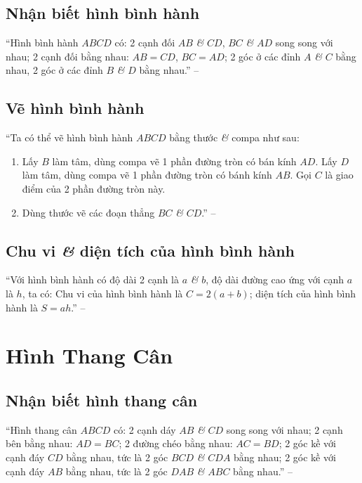 \documentclass[oneside]{book}
\numberwithin{equation}{section}
\begin{document}
\subsection{Nhận biết hình bình hành}
``Hình bình hành $ABCD$ có: 2 cạnh đối $AB$ \textit{\&} $CD$, $BC$ \textit{\&} $AD$ song song với nhau; 2 cạnh đối bằng nhau: $AB = CD$, $BC = AD$; 2 góc ở các đỉnh $A$ \textit{\&} $C$ bằng nhau, 2 góc ở các đỉnh $B$ \textit{\&} $D$ bằng nhau.'' -- \cite[p. 102]{Thai_Anh_Dat_Ha_Loan_Nam_Quang_Toan_6_tap_1}

\subsection{Vẽ hình bình hành}
``Ta có thể vẽ hình bình hành $ABCD$ bằng thước \textit{\&} compa như sau:
\begin{enumerate}
	\item Lấy $B$ làm tâm, dùng compa vẽ 1 phần đường tròn có bán kính $AD$. Lấy $D$ làm tâm, dùng compa vẽ 1 phần đường tròn có bánh kính $AB$. Gọi $C$ là giao điểm của 2 phần đường tròn này.
	\item Dùng thước vẽ các đoạn thẳng $BC$ \textit{\&} $CD$.'' -- \cite[p. 103]{Thai_Anh_Dat_Ha_Loan_Nam_Quang_Toan_6_tap_1}
\end{enumerate}

\subsection{Chu vi \textit{\&} diện tích của hình bình hành}
``Với hình bình hành có độ dài 2 cạnh là $a$ \textit{\&} $b$, độ dài đường cao ứng với cạnh $a$ là $h$, ta có: Chu vi của hình bình hành là $C = 2(a + b)$; diện tích của hình bình hành là $S = ah$.'' -- \cite[p. 103]{Thai_Anh_Dat_Ha_Loan_Nam_Quang_Toan_6_tap_1}

\section{Hình Thang Cân}

\subsection{Nhận biết hình thang cân}
``Hình thang cân $ABCD$ có: 2 cạnh dáy $AB$ \textit{\&} $CD$ song song với nhau; 2 cạnh bên bằng nhau: $AD = BC$; 2 đường chéo bằng nhau: $AC = BD$; 2 góc kề với cạnh đáy $CD$ bằng nhau, tức là 2 góc $BCD$ \textit{\&} $CDA$ bằng nhau; 2 góc kề với cạnh đáy $AB$ bằng nhau, tức là 2 góc $DAB$ \textit{\&} $ABC$ bằng nhau.'' -- \cite[p. 105]{Thai_Anh_Dat_Ha_Loan_Nam_Quang_Toan_6_tap_1}
\end{document}
